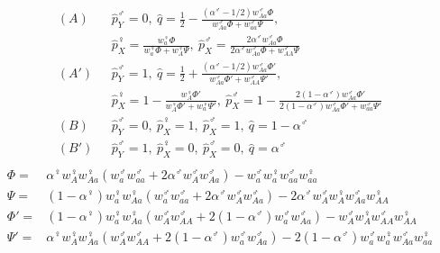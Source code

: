 \documentclass[12pt]{article}
\begin{document}
\begin{equation*}
\begin{split}
(A)\ \ \ &\hat{p}_{Y}^{\male}=0,
\ \hat{q}=\frac{1}{2}-\frac{(\alpha^{\male}-1/2)w_{Aa}^{\male} \Phi}{w_{Aa}^{\male} \Phi+ w_{aa}^{\male} \Psi},\\
&\hat{p}_{X}^{\female}=\frac{w_{a}^{\female} \Phi}{w_{a}^{\female} \Phi+ w_{A}^{\female} \Psi},
\ \hat{p}_{X}^{\male}=\frac{2 \alpha^{\male}w_{Aa}^{\male} \Phi}{2\alpha^{\male}w_{Aa}^{\male} \Phi +w_{AA}^{\male} \Psi}\\
(A')\ \ \ &\hat{p}_{Y}^{\male}=1,
\ \hat{q}=\frac{1}{2}+\frac{(\alpha^{\male}-1/2)w_{Aa}^{\male} \Phi'}{w_{Aa}^{\male} \Phi' + w_{AA}^{\male} \Psi'},\\
&\hat{p}_{X}^{\female}=1-\frac{w_{A}^{\female} \Phi'}{w_{A}^{\female} \Phi'+ w_{a}^{\female} \Psi'},
\ \hat{p}_{X}^{\male}=1-\frac{2(1-\alpha^{\male})w_{Aa}^{\male} \Phi'}{2(1-\alpha^{\male})w_{Aa}^{\male} \Phi'+w_{aa}^{\male} \Psi'}\\
(B)\ \ \ &\hat{p}_{Y}^{\male}=0,\ \hat{p}_{X}^{\female}=1,\ \hat{p}_{X}^{\male}=1, \ \hat{q}=1-\alpha^{\male}\\
(B')\ \ \ &\hat{p}_{Y}^{\male}=1,\ \hat{p}_{X}^{\female}=0,\ \hat{p}_{X}^{\male}=0, \ \hat{q}=\alpha^{\male}\\
\end{split}
\end{equation*}
\begin{equation*}
\begin{split}
\Phi=&\alpha^{\female} w_{A}^{\female} w_{Aa}^{\female}(w_{a}^{\male} w_{aa}^{\male} + 2 \alpha^{\male} w_{A}^{\male} w_{Aa}^{\male}) - w_{a}^{\male} w_{a}^{\female} w_{aa}^{\male} w_{aa}^{\female} \\
\Psi=&(1-\alpha^{\female}) w_{a}^{\female} w_{Aa}^{\female}(w_{a}^{\male} w_{aa}^{\male} + 2 \alpha^{\male} w_{A}^{\male} w_{Aa}^{\male}) - 2\alpha^{\male} w_{A}^{\male} w_{A}^{\female} w_{Aa}^{\male} w_{AA}^{\female}\\
\Phi'=&(1-\alpha^{\female}) w_{a}^{\female} w_{Aa}^{\female}(w_{A}^{\male} w_{AA}^{\male} + 2 (1-\alpha^{\male}) w_{a}^{\male} w_{Aa}^{\male}) - w_{A}^{\male} w_{A}^{\female} w_{AA}^{\male} w_{AA}^{\female}\\
\Psi'=&\alpha^{\female} w_{A}^{\female} w_{Aa}^{\female}(w_{A}^{\male} w_{AA}^{\male} + 2 (1-\alpha^{\male}) w_{a}^{\male} w_{Aa}^{\male}) - 2(1-\alpha^{\male}) w_{a}^{\male} w_{a}^{\female} w_{Aa}^{\male} w_{aa}^{\female}\\
\end{split}
\end{equation*}
\end{document}

